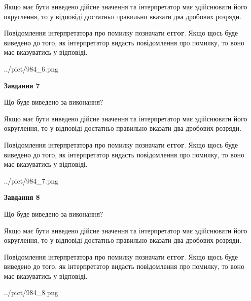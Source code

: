\documentclass[12pt, ukrainian]{article}
\begin{document}
{\begin {Large}
Якщо має бути виведено дійсне значення та інтерпретатор має здійснювати його округлення, 
то у відповіді достатньо правильно вказати два дробових розряди.

Повідомлення інтерпретатора про помилку позначати \textbf{error}.
Якщо щось буде виведено до того, як інтерпретатор видасть повідомлення про помилку, 
то воно має вказуватись у відповіді. \par

\begin{center}
	{../pict/984_6.png}
\end{center}
\newpage

{\begin {center}\textbf{Завдання 7}\end {center}}\par
Що буде виведено за виконання? \par

Якщо має бути виведено дійсне значення та інтерпретатор має здійснювати його округлення, 
то у відповіді достатньо правильно вказати два дробових розряди.

Повідомлення інтерпретатора про помилку позначати \textbf{error}.
Якщо щось буде виведено до того, як інтерпретатор видасть повідомлення про помилку, 
то воно має вказуватись у відповіді. \par

\begin{center}
	{../pict/984_7.png}
\end{center}
\newpage

{\begin {center}\textbf{Завдання 8}\end {center}}\par
Що буде виведено за виконання? \par

Якщо має бути виведено дійсне значення та інтерпретатор має здійснювати його округлення, 
то у відповіді достатньо правильно вказати два дробових розряди.

Повідомлення інтерпретатора про помилку позначати \textbf{error}.
Якщо щось буде виведено до того, як інтерпретатор видасть повідомлення про помилку, 
то воно має вказуватись у відповіді. \par

\begin{center}
	{../pict/984_8.png}
\end{center}
\newpage


\end{Large}}
\end{document}
